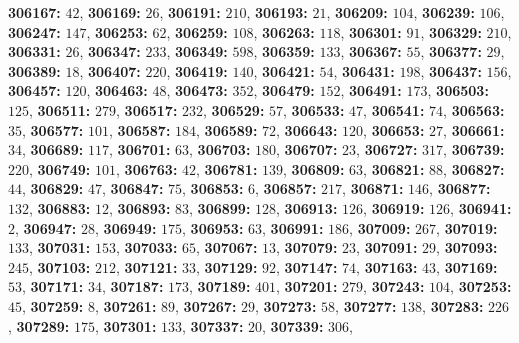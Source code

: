 \textsf{\bfseries 306167:} $42$, \textsf{\bfseries 306169:} $26$, \textsf{\bfseries 306191:} $210$, \textsf{\bfseries 306193:} $21$, \textsf{\bfseries 306209:} $104$, \textsf{\bfseries 306239:} $106$, \textsf{\bfseries 306247:} $147$, \textsf{\bfseries 306253:} $62$, \textsf{\bfseries 306259:} $108$, \textsf{\bfseries 306263:} $118$, \textsf{\bfseries 306301:} $91$, \textsf{\bfseries 306329:} $210$, \textsf{\bfseries 306331:} $26$, \textsf{\bfseries 306347:} $233$, \textsf{\bfseries 306349:} $598$, \textsf{\bfseries 306359:} $133$, \textsf{\bfseries 306367:} $55$, \textsf{\bfseries 306377:} $29$, \textsf{\bfseries 306389:} $18$, \textsf{\bfseries 306407:} $220$, \textsf{\bfseries 306419:} $140$, \textsf{\bfseries 306421:} $54$, \textsf{\bfseries 306431:} $198$, \textsf{\bfseries 306437:} $156$, \textsf{\bfseries 306457:} $120$, \textsf{\bfseries 306463:} $48$, \textsf{\bfseries 306473:} $352$, \textsf{\bfseries 306479:} $152$, \textsf{\bfseries 306491:} $173$, \textsf{\bfseries 306503:} $125$, \textsf{\bfseries 306511:} $279$, \textsf{\bfseries 306517:} $232$, \textsf{\bfseries 306529:} $57$, \textsf{\bfseries 306533:} $47$, \textsf{\bfseries 306541:} $74$, \textsf{\bfseries 306563:} $35$, \textsf{\bfseries 306577:} $101$, \textsf{\bfseries 306587:} $184$, \textsf{\bfseries 306589:} $72$, \textsf{\bfseries 306643:} $120$, \textsf{\bfseries 306653:} $27$, \textsf{\bfseries 306661:} $34$, \textsf{\bfseries 306689:} $117$, \textsf{\bfseries 306701:} $63$, \textsf{\bfseries 306703:} $180$, \textsf{\bfseries 306707:} $23$, \textsf{\bfseries 306727:} $317$, \textsf{\bfseries 306739:} $220$, \textsf{\bfseries 306749:} $101$, \textsf{\bfseries 306763:} $42$, \textsf{\bfseries 306781:} $139$, \textsf{\bfseries 306809:} $63$, \textsf{\bfseries 306821:} $88$, \textsf{\bfseries 306827:} $44$, \textsf{\bfseries 306829:} $47$, \textsf{\bfseries 306847:} $75$, \textsf{\bfseries 306853:} $6$, \textsf{\bfseries 306857:} $217$, \textsf{\bfseries 306871:} $146$, \textsf{\bfseries 306877:} $132$, \textsf{\bfseries 306883:} $12$, \textsf{\bfseries 306893:} $83$, \textsf{\bfseries 306899:} $128$, \textsf{\bfseries 306913:} $126$, \textsf{\bfseries 306919:} $126$, \textsf{\bfseries 306941:} $2$, \textsf{\bfseries 306947:} $28$, \textsf{\bfseries 306949:} $175$, \textsf{\bfseries 306953:} $63$, \textsf{\bfseries 306991:} $186$, \textsf{\bfseries 307009:} $267$, \textsf{\bfseries 307019:} $133$, \textsf{\bfseries 307031:} $153$, \textsf{\bfseries 307033:} $65$, \textsf{\bfseries 307067:} $13$, \textsf{\bfseries 307079:} $23$, \textsf{\bfseries 307091:} $29$, \textsf{\bfseries 307093:} $245$, \textsf{\bfseries 307103:} $212$, \textsf{\bfseries 307121:} $33$, \textsf{\bfseries 307129:} $92$, \textsf{\bfseries 307147:} $74$, \textsf{\bfseries 307163:} $43$, \textsf{\bfseries 307169:} $53$, \textsf{\bfseries 307171:} $34$, \textsf{\bfseries 307187:} $173$, \textsf{\bfseries 307189:} $401$, \textsf{\bfseries 307201:} $279$, \textsf{\bfseries 307243:} $104$, \textsf{\bfseries 307253:} $45$, \textsf{\bfseries 307259:} $8$, \textsf{\bfseries 307261:} $89$, \textsf{\bfseries 307267:} $29$, \textsf{\bfseries 307273:} $58$, \textsf{\bfseries 307277:} $138$, \textsf{\bfseries 307283:} $226$, \textsf{\bfseries 307289:} $175$, \textsf{\bfseries 307301:} $133$, \textsf{\bfseries 307337:} $20$, \textsf{\bfseries 307339:} $306$, 
